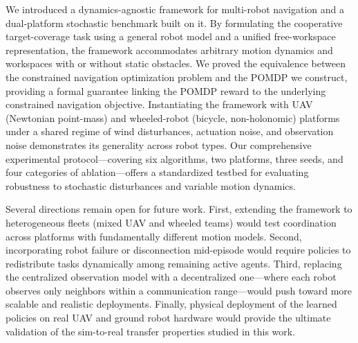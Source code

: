 \documentclass{article}
\begin{document}
We introduced a dynamics-agnostic framework for multi-robot navigation and a dual-platform stochastic benchmark built on it. By formulating the cooperative target-coverage task using a general robot model and a unified free-workspace representation, the framework accommodates arbitrary motion dynamics and workspaces with or without static obstacles. We proved the equivalence between the constrained navigation optimization problem and the POMDP we construct, providing a formal guarantee linking the POMDP reward to the underlying constrained navigation objective. Instantiating the framework with UAV (Newtonian point-mass) and wheeled-robot (bicycle, non-holonomic) platforms under a shared regime of wind disturbances, actuation noise, and observation noise demonstrates its generality across robot types. Our comprehensive experimental protocol---covering six algorithms, two platforms, three seeds, and four categories of ablation---offers a standardized testbed for evaluating robustness to stochastic disturbances and variable motion dynamics.

Several directions remain open for future work. First, extending the framework to heterogeneous fleets (mixed UAV and wheeled teams) would test coordination across platforms with fundamentally different motion models. Second, incorporating robot failure or disconnection mid-episode would require policies to redistribute tasks dynamically among remaining active agents. Third, replacing the centralized observation model with a decentralized one---where each robot observes only neighbors within a communication range---would push toward more scalable and realistic deployments. Finally, physical deployment of the learned policies on real UAV and ground robot hardware would provide the ultimate validation of the sim-to-real transfer properties studied in this work.


\clearpage

\end{document}

